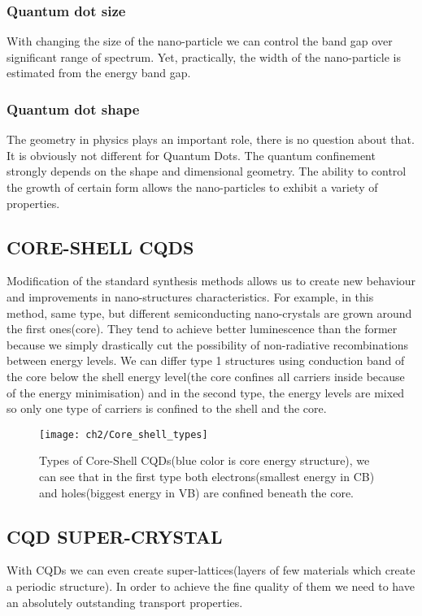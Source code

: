 \subsubsection{Quantum dot size}
With changing the size of the nano-particle we can control the band gap over significant range of spectrum. Yet, practically, the width of the nano-particle is estimated from the energy band gap.
 \cite{Yu2003}
 
\subsubsection{Quantum dot shape}
The geometry in physics plays an important role, there is no question about that. It is obviously not different for Quantum Dots. The quantum confinement strongly depends on the shape and dimensional geometry. The ability to control the growth of certain form allows the nano-particles to exhibit a variety of properties. 

\subsection{CORE-SHELL CQDS}     
Modification of the standard synthesis methods allows us to create new behaviour and improvements in nano-structures characteristics. For example, in this method, same type, but different semiconducting nano-crystals are grown around the first ones(core). They tend to achieve better luminescence than the former because we simply drastically cut the possibility of non-radiative recombinations between energy levels. We can differ type 1 structures using conduction band of the core below the shell energy level(the core confines all carriers inside because of the energy minimisation) and in the second type, the energy levels are mixed so only one type of carriers is confined to the shell and the core. \cite{phdsemi}

\begin{figure}[h]
\centering
\texttt{[image: ch2/Core\_shell\_types]}
\caption{Types of Core-Shell CQDs(blue color is core energy structure), we can see that in the first type both electrons(smallest energy in CB) and holes(biggest energy in VB) are confined beneath the core. \cite{coreshell}}
\end{figure}

\subsection{CQD SUPER-CRYSTAL}
With CQDs we can even create super-lattices(layers of few materials which create a periodic structure). In order to achieve the fine quality of them we need to have an absolutely outstanding transport properties. \cite{tranSupLat}
